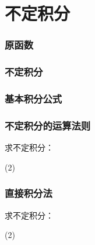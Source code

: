 \chapter{不定积分}
\subsection{原函数}
\subsection{不定积分}
\begin{Practice}
  \begin{question}
    \item 
    \item 
    \item 
    \item 
  \end{question}
\end{Practice}

\subsection{基本积分公式}
\begin{Practice}
  \begin{question}
    \item 
    \item 
  \end{question}
\end{Practice}

\subsection{不定积分的运算法则}
\begin{Practice}
  求不定积分：
  \begin{tasks}(2)
    \task
    \task
    \task
    \task
    \task
    \task
    \task
    \task
  \end{tasks}
\end{Practice}

\subsection{直接积分法}
\begin{Practice}
  求不定积分：
  \begin{tasks}(2)
    \task
    \task
    \task
    \task
    \task
    \task
    \task
    \task
    \task
    \task
  \end{tasks}
\end{Practice}

